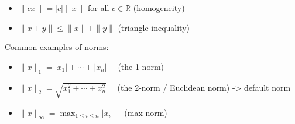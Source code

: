 \documentclass[13pt]{article}
\theoremstyle{definition}
\theoremstyle{remark}
\begin{document}
\begin{multicols}{2}
\begin{itemize}
  \item $\|c x\|=|c|\|x\|$ for all $c \in \mathbb{R}$ (homogeneity)

  \item $\|x+y\| \leq\|x\|+\|y\|$ (triangle inequality)

\end{itemize}

Common examples of norms:

\begin{itemize}
  \item $\|x\|_{1}=\left|x_{1}\right|+\cdots+\left|x_{n}\right| \quad$ (the 1-norm)

  \item $\|x\|_{2}=\sqrt{x_{1}^{2}+\cdots+x_{n}^{2}} \quad$ (the 2-norm / Euclidean norm)  -> default norm

  \item $\|x\|_{\infty}=\max _{1 \leq i \leq n}\left|x_{i}\right| \quad$ (max-norm)

\end{itemize}




\end{multicols}

\headrule
\end{document}
